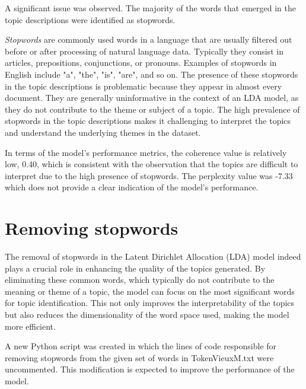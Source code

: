 \documentclass[10pt]{article} %
\begin{document}
	A significant issue was observed. The majority of the words that emerged in the topic descriptions were identified as stopwords. 
	
	\textit{Stopwords} are commonly used words in a language that are usually filtered out before or after processing of natural language data. Typically they consist in articles, prepositions, conjunctions, or pronouns. Examples of stopwords in English include "a", "the", "is", "are", and so on. The presence of these stopwords in the topic descriptions is problematic because they appear in almost every document. They are generally uninformative in the context of an LDA model, as they do not contribute to the theme or subject of a topic. The high prevalence of stopwords in the topic descriptions makes it challenging to interpret the topics and understand the underlying themes in the dataset.
	
	In terms of the model's performance metrics, the coherence value is relatively low, 0.40, which is consistent with the observation that the topics are difficult to interpret due to the high presence of stopwords. The perplexity value was -7.33 which does not provide a clear indication of the model's performance. 
	
	\section{Removing stopwords}
	
	The removal of stopwords in the Latent Dirichlet Allocation (LDA) model indeed plays a crucial role in enhancing the quality of the topics generated. By eliminating these common words, which typically do not contribute to the meaning or theme of a topic, the model can focus on the most significant words for topic identification. This not only improves the interpretability of the topics but also reduces the dimensionality of the word space used, making the model more efficient.
	
	A new Python script was created in which the lines of code responsible for removing stopwords from the given set of words in TokenVieuxM.txt were uncommented. This modification is expected to improve the performance of the model. 
	
\end{document}
